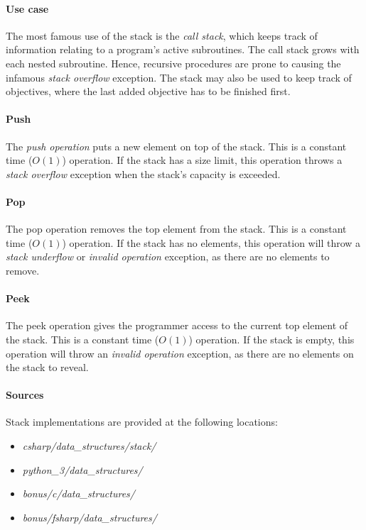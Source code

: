 \documentclass{article}
\begin{document}
\paragraph{Use case}
The most famous use of the stack is the {\em call stack}, which keeps track of information relating to a program's active
subroutines. The call stack grows with each nested subroutine. Hence, recursive procedures are prone to causing the infamous
{\em stack overflow} exception. The stack may also be used to keep track of objectives, where the last added objective has to be
finished first.

\paragraph{Push}
The {\em push operation} puts a new element on top of the stack. This is a constant time (\(O(1)\)) operation.
If the stack has a size limit, this operation throws a {\em stack overflow} exception when the stack's capacity
is exceeded.

\paragraph{Pop}
The pop operation removes the top element from the stack. This is a constant time (\(O(1)\)) operation.
If the stack has no elements, this operation will throw a {\em stack underflow} or {\em invalid operation}
exception, as there are no elements to remove.

\paragraph{Peek}
The peek operation gives the programmer access to the current top element of the stack.
This is a constant time (\(O(1)\)) operation. If the stack is empty, this operation will throw an
{\em invalid operation} exception, as there are no elements on the stack to reveal.

\begin{samepage}
  \paragraph{Sources}
  Stack implementations are provided at the following locations:
  \begin{itemize}
  \item{{\em csharp/data\_structures/stack/}}
  \item{{\em python\_3/data\_structures/}}
  \item{{\em bonus/c/data\_structures/}}
  \item{{\em bonus/fsharp/data\_structures/}}
  \end{itemize}
\end{samepage}
\end{document}
